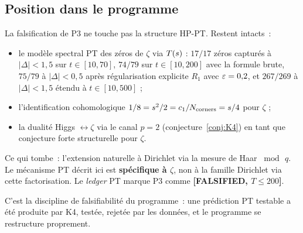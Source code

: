 \subsection{Position dans le programme}
\label{sec:P3_position}

La falsification de P3 ne touche pas la structure HP-PT. Restent
intacts~:
\begin{itemize}[nosep,leftmargin=*]
\item le modèle spectral PT des zéros de $\zeta$ via $T(s)$ :
$17/17$ zéros capturés à $|\Delta| < 1{,}5$ sur $t \in [10, 70]$,
$74/79$ sur $t \in [10, 200]$ avec la formule brute, $75/79$ à
$|\Delta| < 0{,}5$ après régularisation explicite $R_1$ avec
$\varepsilon = 0{,}2$, et $267/269$ à $|\Delta| < 1{,}5$ étendu à
$t \in [10, 500]$ ;
\item l'identification cohomologique
$1/8 = s^{2}/2 = c_1/N_{\mathrm{corners}} = s/4$
pour $\zeta$ ;
\item la dualité Higgs $\leftrightarrow \zeta$ via le canal $p = 2$
(conjecture~\ref{conj:K4}) en tant que conjecture forte structurelle
pour $\zeta$.
\end{itemize}

Ce qui tombe~: l'extension naturelle à Dirichlet via la mesure de Haar
$\bmod\,q$. Le mécanisme PT décrit ici est \textbf{spécifique à $\zeta$},
non à la famille Dirichlet via cette factorisation. Le \emph{ledger} PT
marque P3 comme \textbf{[FALSIFIED, $T \le 200$]}.

C'est la discipline de falsifiabilité du programme~: une prédiction PT
testable a été produite par K4, testée, rejetée par les données, et le
programme se restructure proprement.

